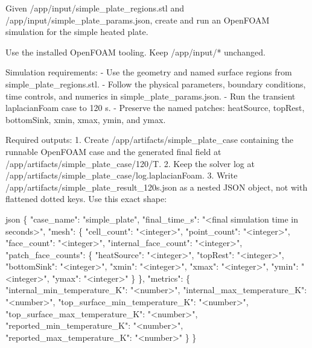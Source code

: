 \begin{instructionbox}
Given \textasciigrave{}/app/input/simple\_plate\_regions.stl\textasciigrave{} and \textasciigrave{}/app/input/simple\_plate\_params.json\textasciigrave{}, create and run an OpenFOAM simulation for the simple heated plate.

Use the installed OpenFOAM tooling. Keep \textasciigrave{}/app/input/*\textasciigrave{} unchanged.

Simulation requirements:
- Use the geometry and named surface regions from \textasciigrave{}simple\_plate\_regions.stl\textasciigrave{}.
- Follow the physical parameters, boundary conditions, time controls, and numerics in \textasciigrave{}simple\_plate\_params.json\textasciigrave{}.
- Run the transient \textasciigrave{}laplacianFoam\textasciigrave{} case to \textasciigrave{}120 s\textasciigrave{}.
- Preserve the named patches: \textasciigrave{}heatSource\textasciigrave{}, \textasciigrave{}topRest\textasciigrave{}, \textasciigrave{}bottomSink\textasciigrave{}, \textasciigrave{}xmin\textasciigrave{}, \textasciigrave{}xmax\textasciigrave{}, \textasciigrave{}ymin\textasciigrave{}, and \textasciigrave{}ymax\textasciigrave{}.

Required outputs:
1. Create \textasciigrave{}/app/artifacts/simple\_plate\_case\textasciigrave{} containing the runnable OpenFOAM case and the generated final field at \textasciigrave{}/app/artifacts/simple\_plate\_case/120/T\textasciigrave{}.
2. Keep the solver log at \textasciigrave{}/app/artifacts/simple\_plate\_case/log.laplacianFoam\textasciigrave{}.
3. Write \textasciigrave{}/app/artifacts/simple\_plate\_result\_120s.json\textasciigrave{} as a nested JSON object, not with flattened dotted keys. Use this exact shape:

\textasciigrave{}\textasciigrave{}\textasciigrave{}json
\{
  "case\_name": "simple\_plate",
  "final\_time\_s": "\textless{}final simulation time in seconds\textgreater{}",
  "mesh": \{
    "cell\_count": "\textless{}integer\textgreater{}",
    "point\_count": "\textless{}integer\textgreater{}",
    "face\_count": "\textless{}integer\textgreater{}",
    "internal\_face\_count": "\textless{}integer\textgreater{}",
    "patch\_face\_counts": \{
      "heatSource": "\textless{}integer\textgreater{}",
      "topRest": "\textless{}integer\textgreater{}",
      "bottomSink": "\textless{}integer\textgreater{}",
      "xmin": "\textless{}integer\textgreater{}",
      "xmax": "\textless{}integer\textgreater{}",
      "ymin": "\textless{}integer\textgreater{}",
      "ymax": "\textless{}integer\textgreater{}"
    \}
  \},
  "metrics": \{
    "internal\_min\_temperature\_K": "\textless{}number\textgreater{}",
    "internal\_max\_temperature\_K": "\textless{}number\textgreater{}",
    "top\_surface\_min\_temperature\_K": "\textless{}number\textgreater{}",
    "top\_surface\_max\_temperature\_K": "\textless{}number\textgreater{}",
    "reported\_min\_temperature\_K": "\textless{}number\textgreater{}",
    "reported\_max\_temperature\_K": "\textless{}number\textgreater{}"
  \}
\}
\textasciigrave{}\textasciigrave{}\textasciigrave{}


\end{instructionbox}
